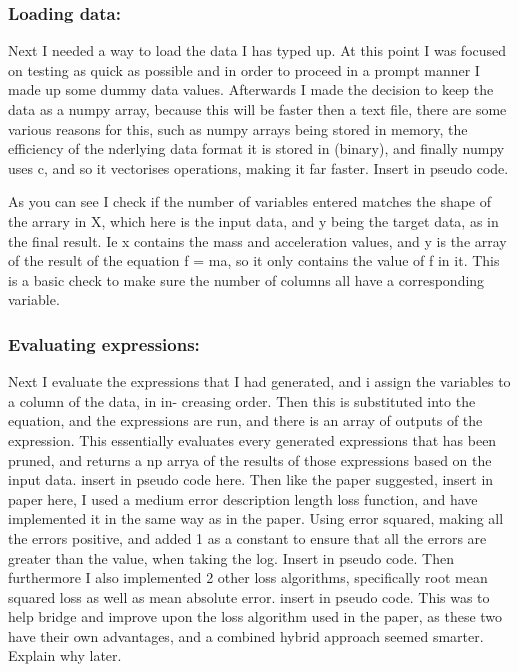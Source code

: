 \documentclass{article}
\begin{document}
\subsubsection{Loading data:}

Next I needed a way to load the data I has typed up. At this point I was focused on testing as quick as possible
and in order to proceed in a prompt manner I made up some dummy data values. Afterwards I made the decision
to keep the data as a numpy array, because this will be faster then a text file, there are some various reasons for
this, such as numpy arrays being stored in memory, the efficiency of the nderlying data format it is stored in
(binary), and finally numpy uses c, and so it vectorises operations, making it far faster.
Insert in pseudo code.


As you can see I check if the number of variables entered matches the shape of the arrary in X, which here is the
input data, and y being the target data, as in the final result. Ie x contains the mass and acceleration values, and
y is the array of the result of the equation f = ma, so it only contains the value of f in it. This is a basic check to
make sure the number of columns all have a corresponding variable.

\subsubsection{Evaluating expressions:}
Next I evaluate the expressions that I had generated, and i assign the variables to a column of the data, in in-
creasing order. Then this is substituted into the equation, and the expressions are run, and there is an array
of outputs of the expression. This essentially evaluates every generated expressions that has been pruned, and
returns a np arrya of the results of those expressions based on the input data.
insert in pseudo code here.
Then like the paper suggested, insert in paper here, I used a medium error description length loss function, and
have implemented it in the same way as in the paper. Using error squared, making all the errors positive, and
added 1 as a constant to ensure that all the errors are greater than the value, when taking the log.
Insert in pseudo code.
Then furthermore I also implemented 2 other loss algorithms, specifically root mean squared loss as well as
mean absolute error.
insert in pseudo code.
This was to help bridge and improve upon the loss algorithm used in the paper, as these two have their own
advantages, and a combined hybrid approach seemed smarter.
Explain why later.
\end{document}
